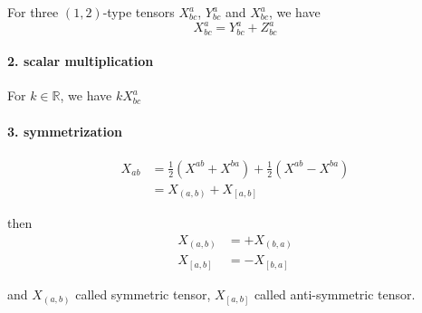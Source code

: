 For three $(1,2)$-type tensors $X^{a}_{bc}$, $Y^{a}_{bc}$ and $X^{a}_{bc}$, we have
\begin{equation}
X^{a}_{bc} = Y^{a}_{bc} + Z^{a}_{bc}
\end{equation}


\paragraph{2. scalar multiplication} %

For $k\in\mathbb{R}$, we have $kX^{a}_{bc}$

\paragraph{3. symmetrization} %


\begin{equation}
\begin{aligned}
X_{ab} &= \frac{1}{2}\left(X^{ab} + X^{ba}\right) + \frac{1}{2}\left(X^{ab} - X^{ba}\right)\\
&= X_{(a,b)} + X_{[a,b]}
\end{aligned}
\end{equation}

then 
\begin{equation}
\begin{aligned}
X_{(a,b)} &= + X_{(b,a)}\\
X_{[a,b]} &= - X_{[b,a]}
\end{aligned}
\end{equation}


and $X_{(a,b)}$ called symmetric tensor, $X_{[a,b]}$ called anti-symmetric tensor.



